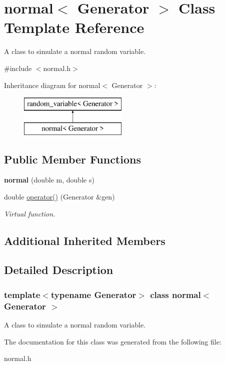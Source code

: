 \hypertarget{classnormal}{}\section{normal$<$ Generator $>$ Class Template Reference}
\label{classnormal}


A class to simulate a normal random variable.  




{\ttfamily \#include $<$normal.\+h$>$}

Inheritance diagram for normal$<$ Generator $>$\+:\begin{figure}[H]
\begin{center}
\leavevmode
\includegraphics[height=2.000000cm]{classnormal}
\end{center}
\end{figure}
\subsection*{Public Member Functions}
\begin{DoxyCompactItemize}
\item 
\mbox{\label{classnormal_af8582789d606124cf4cfdf981c7b5943}} 
{\bfseries normal} (double m, double s)
\item 
\mbox{\label{classnormal_a56c48e011ff2fbce46aea55f1efbbbc1}} 
double \mbox{\hyperlink{classnormal_a56c48e011ff2fbce46aea55f1efbbbc1}{operator()}} (Generator \&gen)
\begin{DoxyCompactList}\small\item\em Virtual function. \end{DoxyCompactList}\end{DoxyCompactItemize}
\subsection*{Additional Inherited Members}


\subsection{Detailed Description}
\subsubsection*{template$<$typename Generator$>$\newline
class normal$<$ Generator $>$}

A class to simulate a normal random variable. 

The documentation for this class was generated from the following file\+:\begin{DoxyCompactItemize}
\item 
normal.\+h\end{DoxyCompactItemize}
